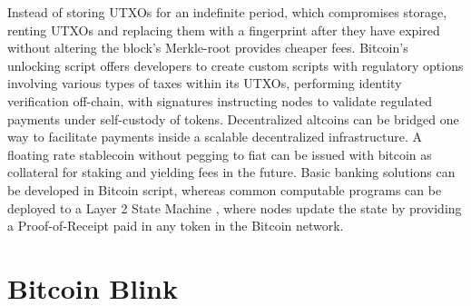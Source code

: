 \documentclass[a4paper, 10pt]{extarticle}
\begin{document}
Instead of storing UTXOs for an indefinite period, which compromises storage, renting UTXOs and replacing them with a fingerprint after they have expired without altering the block’s Merkle-root provides cheaper fees. Bitcoin’s unlocking script offers developers to create custom scripts with regulatory options involving various types of taxes within its UTXOs, performing identity verification off-chain, with signatures instructing nodes to validate regulated payments under self-custody of tokens. Decentralized altcoins can be bridged one way to facilitate payments inside a scalable decentralized infrastructure. A floating rate stablecoin \cite{stablecoin} without pegging to fiat can be issued with bitcoin as collateral for staking and yielding fees in the future. Basic banking solutions can be developed in Bitcoin script, whereas common computable programs can be deployed to a Layer 2 State Machine \cite{wood2014ethereum}, where nodes update the state by providing a Proof-of-Receipt paid in any token in the Bitcoin network.
\section{Bitcoin Blink} 
\end{document}
